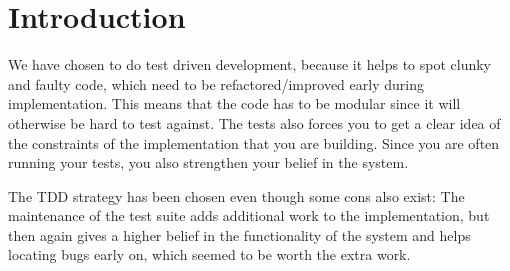 \section{Introduction}
We have chosen to do test driven development, because it helps to spot clunky and faulty code, which need to be refactored/improved early during implementation.
This means that the code has to be modular since it will otherwise be hard to test against.
The tests also forces you to get a clear idea of the constraints of the implementation that you are building.
Since you are often running your tests, you also strengthen your belief in the system.

The TDD strategy has been chosen even though some cons also exist:
The maintenance of the test suite adds additional work to the implementation, but then again gives a higher belief in the functionality of the system and helps locating bugs early on, which seemed to be worth the extra work.


